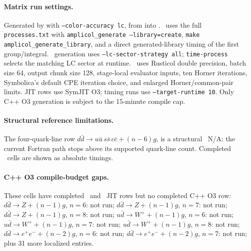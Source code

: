 \paragraph{Matrix run settings.}
\noindent\footnotesize Generated by  with \texttt{--color-accuracy lc}, from  into . \AC\ uses the full \texttt{processes.txt} with \texttt{amplicol\_generate --library=create}, \texttt{make amplicol\_generate\_library}, and a direct generated-library timing of the first group/integral.  \PAC\ generation uses \texttt{--lc-sector-strategy all}; \texttt{time-process} selects the matching LC sector at runtime. \PAC\ uses Rusticol double precision, batch size 64, output chunk size 128, stage-local evaluator inputs, ten Horner iterations, Symbolica's default CPE iteration choice, and enlarged Horner/common-pair limits.  JIT rows use SymJIT \(\mathrm{O}3\); timing runs use \texttt{--target-runtime 10}.  Only C++ O3 generation is subject to the 15-minute compile cap.
\par\smallskip
\paragraph{Structural reference limitations.}
The four-quark-line row \(d\bar d\to u\bar u\,s\bar s\,c\bar c+(n-6)g\), is a structural \AC\ N/A: the current Fortran path stops above its supported quark-line count.  Completed \PAC\ cells are shown as absolute timings.
\par\smallskip
\paragraph{C++ O3 compile-budget gaps.}
These cells have completed \AC\ and \PAC\ JIT rows but no completed C++ O3 row: $d\bar d\to Z+(n-1)g$, \(n=6\): not run; $d\bar d\to Z+(n-1)g$, \(n=7\): not run; $d\bar d\to Z+(n-1)g$, \(n=8\): not run; $u\bar d\to W^++(n-1)g$, \(n=6\): not run; $u\bar d\to W^++(n-1)g$, \(n=7\): not run; $u\bar d\to W^++(n-1)g$, \(n=8\): not run; $d\bar d\to e^+e^-+(n-2)g$, \(n=6\): not run; $d\bar d\to e^+e^-+(n-2)g$, \(n=7\): not run; plus 31 more localized entries.
\par\smallskip